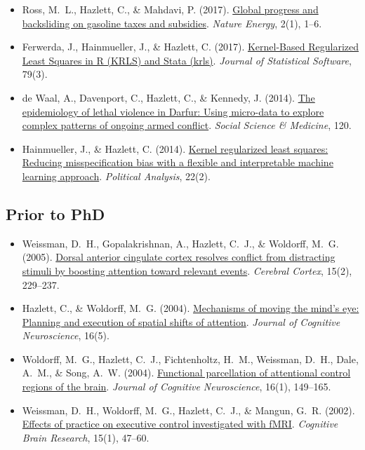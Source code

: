 \documentclass[11pt]{article}
\newcommand{\pubitem}[1]{\item #1}
\begin{document}
\begin{itemize}
\pubitem{Ross, M.~L., Hazlett, C., \& Mahdavi, P. (2017). \href{https://chadhazlett.com/publications.html#ross_hazlett_mahdavi_2017_gasoline}{Global progress and backsliding on gasoline taxes and subsidies}. \textit{Nature Energy}, 2(1), 1--6.}

\pubitem{Ferwerda, J., Hainmueller, J., \& Hazlett, C. (2017). \href{https://chadhazlett.com/publications.html#ferwerda_hainmueller_hazlett_2017_krls_jss}{Kernel-Based Regularized Least Squares in R (KRLS) and Stata (krls)}. \textit{Journal of Statistical Software}, 79(3).}

\pubitem{de Waal, A., Davenport, C., Hazlett, C., \& Kennedy, J. (2014). \href{https://chadhazlett.com/publications.html#dewaal_2014_darfur}{The epidemiology of lethal violence in Darfur: Using micro-data to explore complex patterns of ongoing armed conflict}. \textit{Social Science \& Medicine}, 120.}

\pubitem{Hainmueller, J., \& Hazlett, C. (2014). \href{https://chadhazlett.com/publications.html#hainmueller_hazlett_2014_krls_pa}{Kernel regularized least squares: Reducing misspecification bias with a flexible and interpretable machine learning approach}. \textit{Political Analysis}, 22(2).}
\end{itemize}

\subsection{Prior to PhD}
\begin{itemize}
\pubitem{Weissman, D.~H., Gopalakrishnan, A., Hazlett, C.~J., \& Woldorff, M.~G. (2005). \href{https://chadhazlett.com/publications.html#weissman_2005_dacc}{Dorsal anterior cingulate cortex resolves conflict from distracting stimuli by boosting attention toward relevant events}. \textit{Cerebral Cortex}, 15(2), 229--237.}

\pubitem{Hazlett, C., \& Woldorff, M.~G. (2004). \href{https://chadhazlett.com/publications.html#hazlett_woldorff_2004_mindseye}{Mechanisms of moving the mind's eye: Planning and execution of spatial shifts of attention}. \emph{Journal of Cognitive Neuroscience}, 16(5).}

\pubitem{Woldorff, M.~G., Hazlett, C.~J., Fichtenholtz, H.~M., Weissman, D.~H., Dale, A.~M., \& Song, A.~W. (2004). \href{https://chadhazlett.com/publications.html#woldorff_2004_parcellation}{Functional parcellation of attentional control regions of the brain}. \textit{Journal of Cognitive Neuroscience}, 16(1), 149--165.}

\pubitem{Weissman, D.~H., Woldorff, M.~G., Hazlett, C.~J., \& Mangun, G.~R. (2002). \href{https://chadhazlett.com/publications.html#weissman_2002_practice}{Effects of practice on executive control investigated with fMRI}. \textit{Cognitive Brain Research}, 15(1), 47--60.}
\end{itemize}
\end{document}
